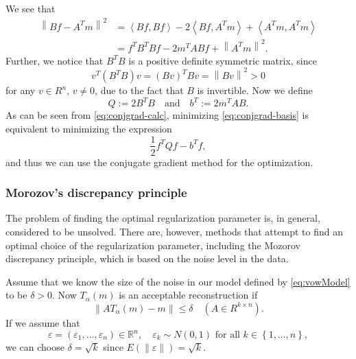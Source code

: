 \documentclass[12pt,a4]{article}
\newcommand{\R}{{\mathbb R}}
\newcommand{\lnorm}{\left\|}
\newcommand{\rnorm}{\right\|}
\newcommand{\eps}{\ensuremath{\varepsilon}}
\begin{document}
We see that
\begin{equation}
\label{eq:conjgrad-calc}
\begin{alignedat}{1}
\lnorm B f - A^T m \rnorm^2
  &= \left< Bf, Bf \right> - 2 \left< Bf, A^T m \right> + \left< A^T m, A^T m \right> \\
  &= f^T B^T B f - 2 m^T A B f + \lnorm A^T m \rnorm^2 .
\end{alignedat}
\end{equation}
Further, we notice that $B^T B$ is a positive definite symmetric matrix, since
\begin{equation*}
v^T (B^T B) v = (B v)^T B v = \lnorm B v \rnorm^2 > 0
\end{equation*}
for any $v \in R^n$, $v \neq 0$, due to the fact that $B$ is invertible. Now we define
\begin{equation*}
Q := 2 B^T B \quad \text{and} \quad b^T := 2 m^T A B .
\end{equation*}
As can be seen from \eqref{eq:conjgrad-calc}, minimizing \eqref{eq:conjgrad-basis} is equivalent to minimizing the expression
\begin{equation}
\frac{1}{2} f^T Q f - b^T f ,
\end{equation}
and thus we can use the conjugate gradient method for the optimization.



\subsubsection{Morozov's discrepancy principle}
The problem of finding the optimal regularization parameter is, in general, considered to be unsolved. There are, however, methods that attempt to find an optimal choice of the regularization parameter, including the Mozorov discrepancy principle, which is based on the noise level in the data.

Assume that we know the size of the noise in our model defined by \eqref{eq:vowModel} to be $\delta > 0$. Now $T_\alpha(m)$ is an acceptable reconstruction if 
\begin{equation}
\lnorm AT_\alpha(m)-m\rnorm \leq \delta \quad \left( A \in R^{k \times n}\right).
\end{equation}
If we assume that 
\begin{equation}
\eps = \left(\eps_1, \ldots, \eps_n\right)\in\R^n, \quad \eps_k \sim N\left(0,1\right) \text{ for all } k\in\left\{1, \ldots, n\right\},
\end{equation}
we can choose $\delta = \sqrt{k}$ since $E\left(\lnorm \eps \rnorm\right) = \sqrt{k}.$
\end{document}
